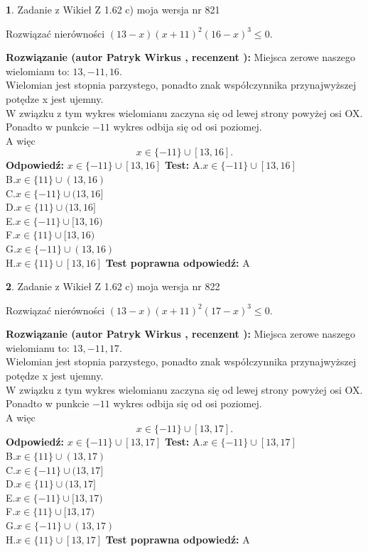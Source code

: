 \documentclass[12pt, a4paper]{article}
\theoremstyle{definition} %
\newtheorem{zad}{}
\newcommand{\zadStart}[1]{\begin{zad}#1\newline}
\newcommand{\zadStop}{\end{zad}}
\newcommand{\rozwStart}[2]{\noindent \textbf{Rozwiązanie (autor #1 , recenzent #2): }\newline}
\newcommand{\rozwStop}{\newline}
\newcommand{\odpStart}{\noindent \textbf{Odpowiedź:}\newline}
\newcommand{\odpStop}{\newline}
\newcommand{\testStart}{\noindent \textbf{Test:}\newline}
\newcommand{\testStop}{\newline}
\newcommand{\kluczStart}{\noindent \textbf{Test poprawna odpowiedź:}\newline}
\newcommand{\kluczStop}{\newline}
\begin{document}
\zadStart{Zadanie z Wikieł Z 1.62 c) moja wersja nr 821}

Rozwiązać nierówności $(13-x)(x+11)^{2}(16-x)^{3}\le0$.
\zadStop
\rozwStart{Patryk Wirkus}{}
Miejsca zerowe naszego wielomianu to: $13, -11, 16$.\\
Wielomian jest stopnia parzystego, ponadto znak współczynnika przy\linebreak najwyższej potędze x jest ujemny.\\ W związku z tym wykres wielomianu zaczyna się od lewej strony powyżej osi OX.\\
Ponadto w punkcie $-11$ wykres odbija się od osi poziomej.\\
A więc $$x \in \{-11\} \cup [13,16].$$
\rozwStop
\odpStart
$x \in \{-11\} \cup [13,16]$
\odpStop
\testStart
A.$x \in \{-11\} \cup [13,16]$\\
B.$x \in \{11\} \cup (13,16)$\\
C.$x \in \{-11\} \cup (13,16]$\\
D.$x \in \{11\} \cup (13,16]$\\
E.$x \in \{-11\} \cup [13,16)$\\
F.$x \in \{11\} \cup [13,16)$\\
G.$x \in \{-11\} \cup (13,16)$\\
H.$x \in \{11\} \cup [13,16]$
\testStop
\kluczStart
A
\kluczStop



\zadStart{Zadanie z Wikieł Z 1.62 c) moja wersja nr 822}

Rozwiązać nierówności $(13-x)(x+11)^{2}(17-x)^{3}\le0$.
\zadStop
\rozwStart{Patryk Wirkus}{}
Miejsca zerowe naszego wielomianu to: $13, -11, 17$.\\
Wielomian jest stopnia parzystego, ponadto znak współczynnika przy\linebreak najwyższej potędze x jest ujemny.\\ W związku z tym wykres wielomianu zaczyna się od lewej strony powyżej osi OX.\\
Ponadto w punkcie $-11$ wykres odbija się od osi poziomej.\\
A więc $$x \in \{-11\} \cup [13,17].$$
\rozwStop
\odpStart
$x \in \{-11\} \cup [13,17]$
\odpStop
\testStart
A.$x \in \{-11\} \cup [13,17]$\\
B.$x \in \{11\} \cup (13,17)$\\
C.$x \in \{-11\} \cup (13,17]$\\
D.$x \in \{11\} \cup (13,17]$\\
E.$x \in \{-11\} \cup [13,17)$\\
F.$x \in \{11\} \cup [13,17)$\\
G.$x \in \{-11\} \cup (13,17)$\\
H.$x \in \{11\} \cup [13,17]$
\testStop
\kluczStart
A
\kluczStop
\end{document}

